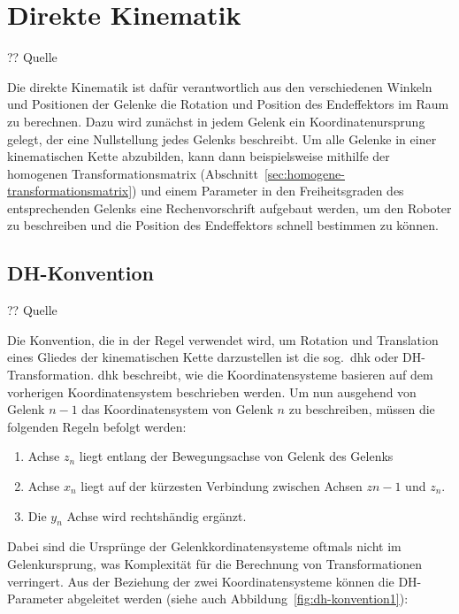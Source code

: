 \cleardoublepage


\chapter{Direkte Kinematik}\label{ch:direkte-kinematik}

?? Quelle

Die direkte Kinematik ist dafür verantwortlich aus den verschiedenen Winkeln und Positionen der Gelenke die Rotation und Position des Endeffektors im Raum zu berechnen.
Dazu wird zunächst in jedem Gelenk ein Koordinatenursprung gelegt, der eine Nullstellung jedes Gelenks beschreibt.
Um alle Gelenke in einer kinematischen Kette abzubilden, kann dann beispielsweise mithilfe der homogenen Transformationsmatrix (Abschnitt~\ref{sec:homogene-transformationsmatrix}) und einem Parameter in den Freiheitsgraden des entsprechenden Gelenks eine Rechenvorschrift aufgebaut werden, um den Roboter zu beschreiben und die Position des Endeffektors schnell bestimmen zu können.


\section{DH-Konvention}\label{sec:dh-konvention}

?? Quelle

Die Konvention, die in der Regel verwendet wird, um Rotation und Translation eines Gliedes der kinematischen Kette darzustellen ist die sog.\ \ac{dhk} oder DH-Transformation.
\ac{dhk} beschreibt, wie die Koordinatensysteme basieren auf dem vorherigen Koordinatensystem beschrieben werden.
Um nun ausgehend von Gelenk $n-1$ das Koordinatensystem von Gelenk $n$ zu beschreiben, müssen die folgenden Regeln befolgt werden:

\begin{enumerate}
    \item Achse $z_{n}$ liegt entlang der Bewegungsachse von Gelenk des Gelenks
    \item Achse $x_{n}$ liegt auf der kürzesten Verbindung zwischen Achsen $z{n-1}$ und $z_{n}$.
    \item Die $y_{n}$ Achse wird rechtshändig ergänzt.
\end{enumerate}

Dabei sind die Ursprünge der Gelenkkordinatensysteme oftmals nicht im Gelenkursprung, was Komplexität für die Berechnung von Transformationen verringert.
Aus der Beziehung der zwei Koordinatensysteme können die DH-Parameter abgeleitet werden (siehe auch Abbildung~\ref{fig:dh-konvention1}):

